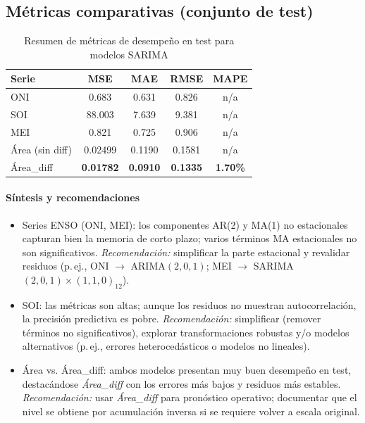 \subsection{Métricas comparativas (conjunto de test)}
\begin{table}[H]
\centering
\caption{Resumen de métricas de desempeño en test para modelos SARIMA}
\label{tab:metricas_sarima}
\begin{tabular}{lcccc}
\toprule
\textbf{Serie} & \textbf{MSE} & \textbf{MAE} & \textbf{RMSE} & \textbf{MAPE} \\
\midrule
ONI  & 0.683  & 0.631  & 0.826  & n/a \\
SOI  & 88.003 & 7.639  & 9.381  & n/a \\
MEI  & 0.821  & 0.725  & 0.906  & n/a \\
Área (sin diff) & 0.02499 & 0.1190 & 0.1581 & n/a \\
Área\_diff      & \textbf{0.01782} & \textbf{0.0910} & \textbf{0.1335} & \textbf{1.70\%} \\
\bottomrule
\end{tabular}
\end{table}

\paragraph{Síntesis y recomendaciones}
\begin{itemize}
    \item Series ENSO (ONI, MEI): los componentes AR(2) y MA(1) no estacionales
    capturan bien la memoria de corto plazo; varios términos MA estacionales no son
    significativos. \emph{Recomendación:} simplificar la parte estacional y revalidar
    residuos (p.\,ej., ONI $\to$ ARIMA$(2,0,1)$; MEI $\to$ SARIMA$(2,0,1)\times(1,1,0)_{12}$).
    \item SOI: las métricas son altas; aunque los residuos no muestran
    autocorrelación, la precisión predictiva es pobre. \emph{Recomendación:} simplificar
    (remover términos no significativos), explorar transformaciones robustas y/o modelos
    alternativos (p.\,ej., errores heterocedásticos o modelos no lineales).
    \item Área vs. Área\_diff: ambos modelos presentan muy buen desempeño en test,
    destacándose \emph{Área\_diff} con los errores más bajos y residuos más
    estables. \emph{Recomendación:} usar \emph{Área\_diff} para pronóstico operativo; 
    documentar que el nivel se obtiene por acumulación inversa si se requiere volver a
    escala original.
\end{itemize}


